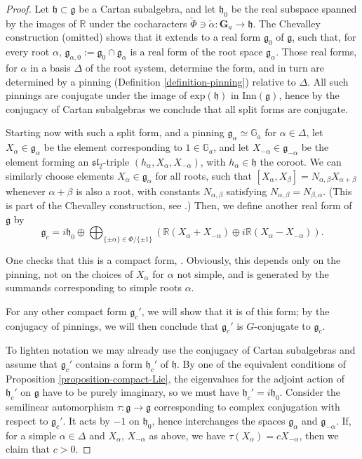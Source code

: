 \begin{proof}
 Let $\mathfrak h \subset \mathfrak g$ be a Cartan subalgebra, and let $\mathfrak h_0$ be the real subspace spanned by the images of $\mathbb R$ under the cocharacters $\check\Phi\ni \check\alpha: \mathbf{G}_a\to \mathfrak h$. The Chevalley construction (omitted) shows that it extends to a real form $\mathfrak g_0$ of $\mathfrak g$, such that, for every root $\alpha$, $\mathfrak g_{\alpha,0}:= \mathfrak g_0 \cap \mathfrak g_\alpha$ is a real form of the root space $\mathfrak g_\alpha$. Those real forms, for $\alpha$ in a basis $\Delta$ of the root system, determine the form, and in turn are determined by a pinning (Definition \ref{definition-pinning}) relative to $\Delta$. All such pinnings are conjugate under the image of $\text{exp}(\mathfrak h)$ in $\text{Inn}(\mathfrak g)$, hence by the conjugacy of Cartan subalgebras we conclude that all split forms are conjugate. 

 Starting now with such a split form, and a pinning $\mathfrak g_\alpha\simeq\mathbb G_a$ for $\alpha\in\Delta$, let $X_\alpha \in \mathfrak g_\alpha$ be the element corresponding to $1\in\mathbb G_a$, and let $X_{-\alpha}\in \mathfrak g_{-\alpha}$ be the element forming an $\mathfrak{sl}_2$-triple $(h_\alpha, X_\alpha, X_{-\alpha})$, with $h_\alpha\in\mathfrak h$ the coroot. We can similarly choose elements $X_\alpha\in\mathfrak g_\alpha$ for all roots, such that $[X_\alpha, X_\beta] = N_{\alpha, \beta} X_{\alpha+\beta}$ whenever $\alpha+\beta$ is also a root, with constants $N_{\alpha,\beta}$ satisfying $N_{\alpha,\beta} = N_{\beta,\alpha}$. (This is part of the Chevalley construction, see \cite[Ch.\ VIII \S 2]{Bourbaki-Lie}.) Then, we define another real form of $\mathfrak g$ by 
 $$ \mathfrak g_c = i \mathfrak h_0 \oplus \bigoplus_{\{\pm \alpha\}\in \Phi/\{\pm 1\}} \left( \mathbb R(X_\alpha+X_{-\alpha}) \oplus  i \mathbb R(X_\alpha - X_{-\alpha})\right ).$$
 
 One checks that this is a compact form, \cite[Ch.\ IX \S 3.2]{Bourbaki-Lie}.  Obviously, this depends only on the pinning, not on the choices of $X_\alpha$ for $\alpha$ not simple, and is generated by the summands corresponding to simple roots $\alpha$. 

  
 For any other compact form $\mathfrak g_c'$, we will show that it is of this form; by the conjugacy of pinnings, we will then conclude that $\mathfrak g_c'$ is $G$-conjugate to $\mathfrak g_c$. 
 
 To lighten notation we may already use the conjugacy of Cartan subalgebras and assume that $\mathfrak g_c'$ contains a form $\mathfrak h_c'$ of $\mathfrak h$. By one of the equivalent conditions of Proposition \ref{proposition-compact-Lie}, the eigenvalues for the adjoint action of $\mathfrak h_c'$ on $\mathfrak g$ have to be purely imaginary, so we must have $\mathfrak h_c' = i \mathfrak h_0$. Consider the semilinear automorphism $\tau:\mathfrak g\to\mathfrak g$ corresponding to complex conjugation with respect to $\mathfrak g_c'$. It acts by $-1$ on $\mathfrak h_0$, hence interchanges the spaces $\mathfrak g_\alpha$ and $\mathfrak g_{-\alpha}$. If, for a simple $\alpha\in \Delta$ and $X_\alpha$, $X_{-\alpha}$ as above, we have $\tau (X_\alpha) = c X_{-\alpha}$, then we claim that $c>0$. 
 

\end{proof}
